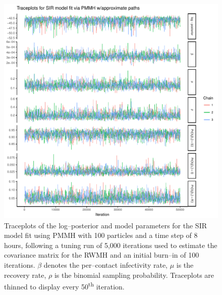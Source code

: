 \begin{figure}[htbp]
	\centering
	\includegraphics[width=0.9\linewidth]{figures/sir_pomp_approx_traceplots}
	\caption[Simulation 1 MCMC traceplots for an SIR model fit using PMMH with approximate particle paths.]{Traceplots of the log--posterior and model parameters for the SIR model fit using PMMH with 100 particles and a time step of 8 hours, following a tuning run of 5,000 iterations used to estimate the covariance matrix for the RWMH and an initial burn--in of 100 iterations. $ \beta $ denotes the per--contact infectivity rate, $ \mu $ is the recovery rate, $ \rho $ is the binomial sampling probability. Traceplots are thinned to display every 50\textsuperscript{th} iteration.}
	\label{fig:sirpompapproxtraceplots}
\end{figure}

